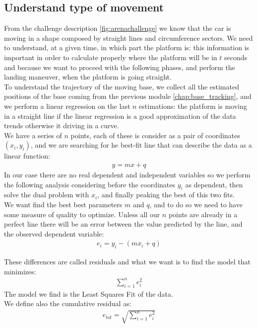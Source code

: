 \subsection{Understand type of movement}
From the challenge description \ref{fig:arenachallenge} we know that the car is moving in a shape composed by straight lines and circumference sectors. We need to understand, at a given time, in which part the platform is: this information is important in order to calculate properly where the platform will be in $t$ seconds and because we want to proceed with the following phases, and perform the landing maneuver, when the platform is going straight.\\

To understand the trajectory of the moving base, we collect all the estimated positions of the base coming from the previous module \ref{chap:base_tracking}, and we perform a linear regression on the last $n$ estimations: the platform is moving in a straight line if the linear regression is a good approximation of the data trends otherwise it driving in a curve.\\

We have a series of $n$ points, each of these is consider as a pair of coordinates $(x_i,y_i)$, and we are searching for he best-fit line that can describe the data as a linear function: 
\begin{align*}
y = mx + q
\end{align*}
In our case there are no real dependent and independent variables so we perform the following analysis considering before the coordinates $y_i$ as dependent, then solve the dual problem with $x_i$, and finally peaking the best of this two fits. \\
We want find the best best parameters $m$ and $q$, and to do so we need to have some measure of quality to optimize. Unless all our $n$ points are already in a perfect line there will be an error between the value predicted by the line, and the observed dependent variable:
\begin{align}
e_i = y_i - (mx_i + q)
\label{theor_resid}
\end{align}

These differences are called residuals and what we want is to find the model that minimizes: 
\begin{align*}
\sum_{i=1}^{n}{e_i^2}
\end{align*}
The model we find is the Least Squares Fit of the data. \\ 
We define also the cumulative residual as: 
\begin{align*}
e_{tot} = \sqrt{\sum_{i=1}^{n}{e_i^2}}
\end{align*}

